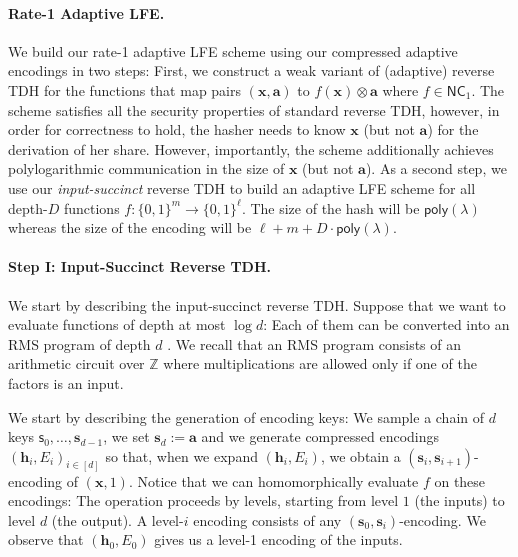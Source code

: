 \documentclass{theoretics}
\newcommand{\Z}{\mathbb{Z}}
\newcommand{\poly}{\mathsf{poly}}
\renewcommand{\sec}{\ensuremath{\lambda}}
\begin{document}
\paragraph{Rate-1 Adaptive LFE.} We build our rate-1 adaptive LFE scheme using our compressed adaptive encodings in two steps: First, we construct a weak variant of (adaptive) reverse TDH for the functions that map pairs $(\mathbf{x}, \mathbf{a})$ to $f(\mathbf{x})\otimes \mathbf{a}$ where $f\in\mathsf{NC}_1$. The scheme satisfies all the security properties of standard reverse TDH, however, in order for correctness to hold, the hasher needs to know $\mathbf{x}$ (but not $\mathbf{a}$) for the derivation of her share. {However, importantly, the scheme additionally achieves} polylogarithmic communication in the size of $\mathbf{x}$ (but not $\mathbf{a}$). As a second step, we use our \emph{input-succinct} reverse TDH to build an adaptive LFE scheme for all depth-$D$ functions $f:\{0, 1\}^m\rightarrow \{0, 1\}^\ell$. The size of the hash will be $\poly(\sec)$ whereas the size of the encoding will be $\ell+m+D\cdot \poly(\sec)$.

\paragraph{Step I: Input-Succinct Reverse TDH.} We start by describing the input-succinct reverse TDH. Suppose that we want to evaluate functions of depth at most $\log d$: Each of them can be converted into an RMS program of depth $d$ \cite{C:BoyGilIsh16}. We recall that an RMS program consists of an arithmetic circuit over $\Z$ where multiplications are allowed only if one of the factors is an input. 

We start by describing the generation of encoding keys: We sample a chain of $d$ keys $\mathsf{s}_0, \dots, \mathbf{s}_{d-1}$, we set $\mathbf{s}_d:=\mathbf{a}$ and we generate compressed encodings $(\mathbf{h}_i, E_i)_{i\in[d]}$ so that, when we expand $(\mathbf{h}_i, E_i)$, we obtain a $(\mathbf{s}_i, \mathbf{s}_{i+1})$-encoding of $(\mathbf{x}, 1)$. Notice that we can homomorphically evaluate $f$ on these encodings: The operation proceeds by levels, starting from level $1$ (the inputs) to level $d$ (the output). A level-$i$ encoding consists of any $(\mathbf{s}_0, \mathbf{s}_i)$-encoding. We observe that $(\mathbf{h}_0, E_0)$ gives us a level-1 encoding of the inputs.
\end{document}
